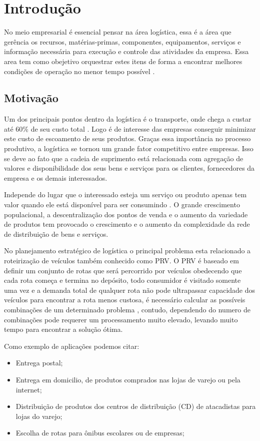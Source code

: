 \chapter[Introdução]{Introdução}

No meio empresarial é essencial pensar na área logística, essa é a área que gerência os recursos, matérias-primas, componentes, equipamentos, serviços e informação necessária para execução e controle das atividades da empresa. 
Essa area tem como obejetivo orquestrar estes itens de forma a encontrar melhores condições de operação no menor tempo possível \cite{DIAS}.

\section{Motivação}

Um dos principais pontos dentro da logística é o transporte, onde chega a custar até 60\% de seu custo total \cite{RODRIGUES}.
Logo é de interesse das empresas conseguir minimizar este custo de escoamento de seus produtos. Graças essa importância no processo produtivo, a logística se tornou um grande fator competitivo entre empresas.
Isso se deve ao fato que a cadeia de suprimento está relacionada com agregação de valores e disponibilidade dos seus bens e serviços para os clientes, fornecedores da empresa e os demais interessados. 

Independe do lugar que o interessado esteja um serviço ou produto apenas tem valor quando ele está disponível para ser consumindo \cite{TSUDA}.
O grande crescimento populacional, a descentralização dos pontos de venda e o aumento da variedade de produtos tem provocado o crescimento e o aumento da complexidade da rede de distribuição de bens e serviços.

No planejamento estratégico de logística o principal problema esta relacionado a roteirização de veículos \cite{TSUDA} também conhecido como PRV. 
O PRV é baseado em definir um conjunto de rotas que será percorrido por veículos obedecendo que cada rota começa e termina no depósito, todo consumidor é visitado somente uma vez e a demanda total de qualquer rota não pode ultrapassar capacidade dos veículos para encontrar a rota menos custosa, é necessário calcular as possíveis combinações de um determinado problema , contudo, dependendo do numero de combinações pode requerer um processamento muito elevado, levando muito tempo para encontrar a solução ótima.

Como exemplo de aplicações podemos citar:
\begin{itemize}
	\item Entrega postal;
	\item Entrega em domicilio, de produtos comprados nas lojas de varejo ou pela internet;
	\item Distribuição de produtos dos centros de distribuição (CD) de atacadistas para lojas do varejo;
	\item Escolha de rotas para ônibus escolares ou de empresas;
\end{itemize}

